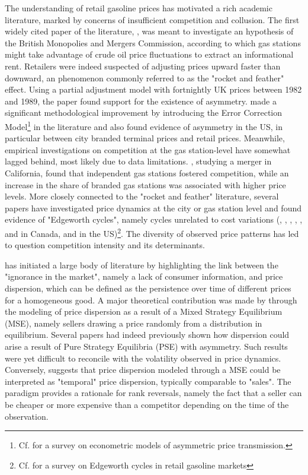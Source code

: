 \documentclass[english]{article}
\begin{document}
The understanding of retail gasoline prices has motivated a rich academic literature, marked by concerns of insufficient competition and collusion. The first widely cited paper of the literature, \cite{BAC91}, was meant to investigate an hypothesis of the British Monopolies and Mergers Commission, according to which gas stations might take advantage of crude oil price fluctuations to extract an informational rent. Retailers were indeed suspected of adjusting prices upward faster than downward, an phenomenon commonly referred to as the "rocket and feather" effect. Using a partial adjustment model with fortnightly UK prices between 1982 and 1989, the paper found support for the existence of asymmetry. \cite{BOR97} made a significant methodological improvement by introducing the Error Correction Model\footnote{Cf. \cite{FRE07} for a survey on econometric models of asymmetric price transmission.} in the literature and also found evidence of asymmetry in the US, in particular between city branded terminal prices and retail prices. Meanwhile, empirical investigations on competition at the gas station-level have somewhat lagged behind, most likely due to data limitations. \cite{HAS04}, studying a merger in California, found that independent gas stations fostered competition, while an increase in the share of branded gas stations was associated with higher price levels. More closely connected to the "rocket and feather" literature, several papers have investigated price dynamics at the city or gas station level and found evidence of "Edgeworth cycles", namely cycles unrelated to cost variations (\cite{ECK02}, \cite{ECK03}, \cite{ECK04a}, \cite{ECK04b}, \cite{NOE07a}, \cite{NOE07b} and \cite{NOE08} in Canada, \cite{LEW09} and \cite{LEW11a} in the US)\footnote{Cf. \cite{ECK13} for a survey on Edgeworth cycles in retail gasoline markets}. The diversity of observed price patterns has led to question competition intensity and its determinants.

\cite{STI61} has initiated a large body of literature by highlighting the link between the "ignorance in the market", namely a lack of consumer information, and price dispersion, which can be defined as the persistence over time of different prices for a homogeneous good. A major theoretical contribution was made by \cite{VAR80} through the modeling of price dispersion as a result of a Mixed Strategy Equilibrium (MSE), namely sellers drawing a price randomly from a distribution in equilibrium. Several papers had indeed previously shown how dispersion could arise a result of Pure Strategy Equilibria (PSE) with asymmetry. Such results were yet difficult to reconcile with the volatility observed in price dynamics. Conversely, \cite{VAR80} suggests that price dispersion modeled through a MSE could be interpreted as "temporal" price dispersion, typically comparable to "sales". The \cite{VAR80} paradigm provides a rationale for rank reversals, namely the fact that a seller can be cheaper or more expensive than a competitor depending on the time of the observation.
\end{document}
